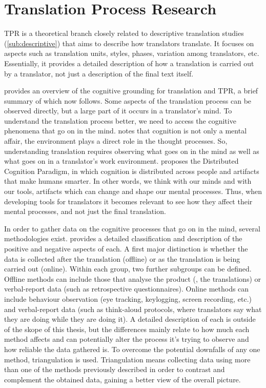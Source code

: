 \section{Translation Process Research}
\label{sec:tpr}

\noindent \acf{TPR} is a theoretical branch closely related to descriptive translation studies (\autoref{sub:descriptive}) that aims to describe how translators translate. It focuses on aspects such as translation units, styles, phases, variation among translators, etc. Essentially, it provides a detailed description of how a translation is carried out by a translator, not just a description of the final text itself. 

\textcite{christensen2011studies} provides an overview of the cognitive grounding for translation and \ac{TPR}, a brief summary of which now follows. Some aspects of the translation process can be observed directly, but a large part of it occurs in a translator's mind. To understand the translation process better, we need to access the cognitive phenomena that go on in the mind. \textcite{risku2010cognitive} notes that cognition is not only a mental affair, the environment plays a direct role in the thought processes. So, understanding translation requires observing what goes on in the mind as well as what goes on in a translator's work environment. \textcite{hutchins2000distributed} proposes the Distributed Cognition Paradigm, in which cognition is distributed across people and artifacts that make humans smarter. In other words, we think with our minds and with our tools, artifacts which can change and shape our mental processes. Thus, when developing tools for translators it becomes relevant to see how they affect their mental processes, and not just the final translation.

In order to gather data on the cognitive processes that go on in the mind, several methodologies exist. \textcite{christensen2011studies} provides a detailed classification and description of the positive and negative aspects of each. A first major distinction is whether the data is collected after the translation (offline) or as the translation is being carried out (online). Within each group, two further subgroups can be defined. Offline methods can include those that analyse the product (\ie, the translations) or verbal-report data (such as retrospective questionnaires). Online methods can include behaviour observation (eye tracking, keylogging, screen recording, etc.) and verbal-report data (such as think-aloud protocols, where translators say what they are doing while they are doing it). A detailed description of each is outside of the skope of this thesis, but the differences mainly relate to how much each method affects and can potentially alter the process it's trying to observe and how reliable the data gathered is. To overcome the potential downfalls of any one method, triangulation is used. Triangulation \parencite{alves2003triangulating} means collecting data using more than one of the methods previously described in order to contrast and complement the obtained data, gaining a better view of the overall picture.

